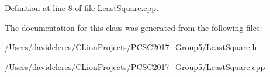 Definition at line 8 of file Least\+Square.\+cpp.



The documentation for this class was generated from the following files\+:\begin{DoxyCompactItemize}
\item 
/\+Users/davidcleres/\+C\+Lion\+Projects/\+P\+C\+S\+C2017\+\_\+\+Group5/\mbox{\hyperlink{_least_square_8h}{Least\+Square.\+h}}\item 
/\+Users/davidcleres/\+C\+Lion\+Projects/\+P\+C\+S\+C2017\+\_\+\+Group5/\mbox{\hyperlink{_least_square_8cpp}{Least\+Square.\+cpp}}\end{DoxyCompactItemize}
